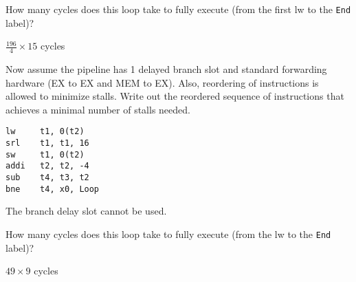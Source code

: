 \begin{blocksection}
\question How many cycles does this loop take to fully execute (from the first lw to the \texttt{End} label)?

\begin{solution}[0.5in]
$\frac{196}{4} \times 15$  cycles
\end{solution}

\question Now assume the pipeline has 1 delayed branch slot and standard forwarding hardware (EX to EX and MEM to EX). Also, reordering of instructions is allowed to minimize stalls. Write out the reordered sequence of instructions that achieves a minimal number of stalls needed. 

\begin{solution}[0.7in]
\begin{verbatim}
lw 	   t1, 0(t2)
srl    t1, t1, 16
sw     t1, 0(t2)
addi   t2, t2, -4
sub    t4, t3, t2
bne    t4, x0, Loop
\end{verbatim}
The branch delay slot cannot be used. 
\end{solution}

\question How many cycles does this loop take to fully execute (from the lw to the \texttt{End} label)?

\begin{solution}[0.5in]
$49 \times 9$ cycles
\end{solution}

\end{blocksection}